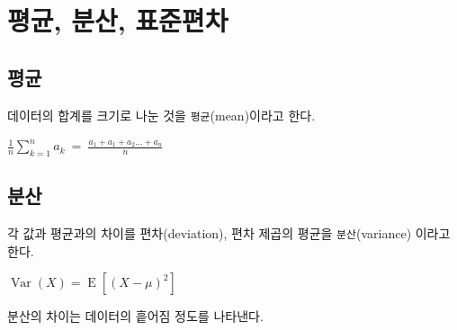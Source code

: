 \documentclass[
  letterpaper,
  DIV=11,
  numbers=noendperiod]{scrreprt}
\begin{document}
\hypertarget{uxd3c9uxade0-uxbd84uxc0b0-uxd45cuxc900uxd3b8uxcc28}{%
\chapter{평균, 분산,
표준편차}\label{uxd3c9uxade0-uxbd84uxc0b0-uxd45cuxc900uxd3b8uxcc28}}

\hypertarget{uxd3c9uxade0}{%
\section{평균}\label{uxd3c9uxade0}}

데이터의 합계를 크기로 나눈 것을 \texttt{평균}(mean)이라고 한다.

\(\frac{1}{n}\sum\limits _{k=1} ^{n} a_k \ =\ \frac{a_1+a_1+a_2...+a_n}{n}\)

\hypertarget{uxbd84uxc0b0}{%
\section{분산}\label{uxbd84uxc0b0}}

각 값과 평균과의 차이를 편차(deviation), 편차 제곱의 평균을
\texttt{분산}(variance) 이라고 한다.

\({\displaystyle \operatorname {Var} (X)=\operatorname {E} \left[(X-\mu )^{2}\right]}\)

분산의 차이는 데이터의 흩어짐 정도를 나타낸다.
\end{document}
